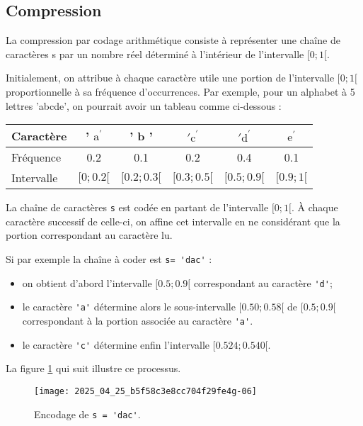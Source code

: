 \subsection{Compression}
La compression par codage arithmétique consiste à représenter une chaîne de caractères s par un nombre réel déterminé à l'intérieur de l'intervalle $[0 ; 1[$.

Initialement, on attribue à chaque caractère utile une portion de l'intervalle $[0 ; 1[$ proportionnelle à sa fréquence d'occurrences. Par exemple, pour un alphabet à 5 lettres 'abcde', on pourrait avoir un tableau comme ci-dessous :

\begin{center}
\begin{tabular}{|l|c|c|c|c|c|}
\hline
Caractère & ' $\mathrm{a}^{\prime}$ & ' b ' & $\mathrm{'c}^{\prime}$ & $\mathrm{'d}^{\prime}$ & $\mathrm{e}^{\prime}$ \\
\hline
Fréquence & 0.2 & 0.1 & 0.2 & 0.4 & 0.1 \\
\hline
Intervalle & $[0 ; 0.2[$ & $[0.2 ; 0.3[$ & $[0.3 ; 0.5[$ & $[0.5 ; 0.9[$ & $[0.9 ; 1[$ \\
\hline
\end{tabular}
\end{center}

La chaîne de caractères \lstinline{s} est codée en partant de l'intervalle $[0 ; 1[$. À chaque caractère successif de celle-ci, on affine cet intervalle en ne considérant que la portion correspondant au caractère lu.

Si par exemple la chaîne à coder est \lstinline{s= 'dac'} :

\begin{itemize}
  \item on obtient d'abord l'intervalle $[0.5; 0.9 [$ correspondant au caractère \lstinline{'d'};
  \item le caractère \lstinline{'a'} détermine alors le sous-intervalle $[0.50 ; 0.58[$ de $[0.5 ; 0.9[$ correspondant à la portion associée au caractère \lstinline{'a'}.
  \item le caractère \lstinline{'c'} détermine enfin l'intervalle $[0.524; 0.540[$.
\end{itemize}

La figure \ref{fig_ccmp_2024_info_02} qui suit illustre ce processus.

\begin{figure}
\centering
\texttt{[image: 2025\_04\_25\_b5f58c3e8cc704f29fe4g-06]}
\caption{Encodage de \lstinline{s = 'dac'}. \label{fig_ccmp_2024_info_02} }
\end{figure}



